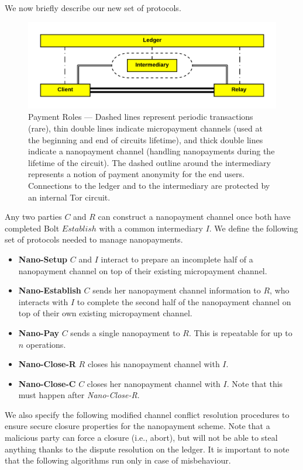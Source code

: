  We now briefly describe our new set of protocols.
\begin{figure}[h] \centering
  \includegraphics[trim={0.5cm, 0.5cm, 0.5cm, 0.5cm}, clip,
    scale=0.6]{images/party_diagram.png}
  \caption[Payment Roles]{Payment Roles --- Dashed lines represent periodic
    transactions (rare), thin double lines indicate micropayment channels (used
    at the beginning and end of circuits lifetime), and thick double lines
    indicate a nanopayment channel (handling nanopayments during the lifetime of
    the circuit). The dashed outline around the intermediary represents a notion
    of payment anonymity for the end users. Connections to the ledger and to the
    intermediary are protected by an internal Tor circuit.}
  \label{fig:parties}
\end{figure}
Any two parties $C$ and $R$ can construct a nanopayment channel once both have
completed Bolt $Establish$ with a common intermediary $I$. We define the
following set of protocols needed to manage nanopayments.

\begin{itemize}
\item \textbf{Nano-Setup} $C$ and $I$ interact to prepare an incomplete half of
  a nanopayment channel on top of their existing micropayment channel.
\item \textbf{Nano-Establish} $C$ sends her nanopayment channel information to
  $R$, who interacts with $I$ to complete the second half of the nanopayment
  channel on top of their own existing micropayment channel.
\item \textbf{Nano-Pay} $C$ sends a single nanopayment to $R$. This is
  repeatable for up to $n$ operations.
\item \textbf{Nano-Close-R} $R$ closes his nanopayment channel with $I$.
\item \textbf{Nano-Close-C} $C$ closes her nanopayment channel with $I$. Note
  that this must happen after \emph{Nano-Close-R}.
\end{itemize}

We also specify the following modified channel conflict resolution procedures to
ensure secure closure properties for the nanopayment scheme. Note that a
malicious party can force a closure (i.e., abort), but will not be able to steal
anything thanks to the dispute resolution on the ledger. It is important to note
that the following algorithms run only in case of misbehaviour.

